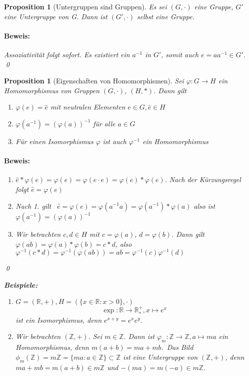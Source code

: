 \documentclass{report}
\newcommand{\R}{\mathbb{R}}
\newcommand{\Z}{\mathbb{Z}}
\theoremstyle{customrem}
\theoremstyle{customdef}
\newtheorem{proposition}[definition]{Proposition}
\renewenvironment{proof}{\paragraph{Beweis: }}{\qed}
\begin{document}
	\begin{proposition}[Untergruppen sind Gruppen]
		Es sei \((G, \cdot)\) eine Gruppe, \(G'\) eine Untergruppe von G. Dann ist \((G', \cdot)\) selbst eine Gruppe.\\
		\begin{proof}
			Assoziativität folgt sofort. Es existiert ein \(a^{-1}\) in \(G'\), somit auch \(e = aa^{-1} \in G'\).\\
		\end{proof}
	\end{proposition}
	
	\begin{proposition}[Eigenschaften von Homomorphismen]
		Sei \(\varphi : G \to H\) ein Homomorphismus von Gruppen \((G, \cdot)\), \((H, \ast)\). Dann gilt
		\begin{enumerate}
			\itemsep0cm
			\item \(\varphi(e) = \hat{e}\) mit neutralen Elementen \(e \in G, \hat{e} \in H\)
			\item \(\varphi(a^{-1}) = (\varphi(a))^{-1}\) für alle \(a \in G\)
			\item Für einen Isomorphismus \(\varphi\) ist auch \(\varphi^{-1}\) ein Homomorphismus
		\end{enumerate}
		\begin{proof}
			\begin{enumerate}
				\item \(\hat{e} * \varphi(e) = \varphi(e) = \varphi(e \cdot e) = \varphi(e) * \varphi(e)\). Nach der Kürzungsregel folgt \(\hat{e} = \varphi(e)\)
				\item Nach 1. gilt \ \(\hat{e} = \varphi(e) = \varphi(a^{-1} a) = \varphi(a^{-1}) * \varphi(a)\) also ist \(\varphi(a^{-1}) = (\varphi(a))^{-1}\)				
				\item Wir betrachten \(c, d \in H\) mit \(c = \varphi(a)\), \(d = \varphi(b)\). Dann gilt \(\varphi(a b) = \varphi(a) * \varphi(b) = c * d\), also \(\varphi^{-1}(c * d) = \varphi^{-1}(\varphi(a b)) = ab = \varphi^{-1}(c) \varphi^{-1}(d)\)
			\end{enumerate}	
		\end{proof}
		
		\textbf{Beispiele:}
		\begin{enumerate}
			\item \(G = (\R, +), H = (\{x \in \R : x > 0\}, \cdot)\)
			\[\exp : \R \to \R^+_*, x \mapsto e^x\]
			ist ein Isomorphismus, denn \(e^{x + y} = e^x e^y\).
			\item Wir betrachten \((\Z, +)\). Sei \(m \in \Z\). Dann ist \(\varphi_m : \Z \to \Z, a \mapsto ma\) ein Homomorphismus, denn \(m(a + b) = ma + mb\).\ Das Bild \(\phi_m(\Z) = m\Z = \{m a : a \in \Z\} \subset \Z\)  ist eine Untergruppe von \((\Z, +)\), denn \(ma + mb = m(a + b) \in m\Z\) und \(-(ma) = m(-a) \in m\Z\).\\	
			

\end{enumerate}
\end{proposition}
\end{document}
